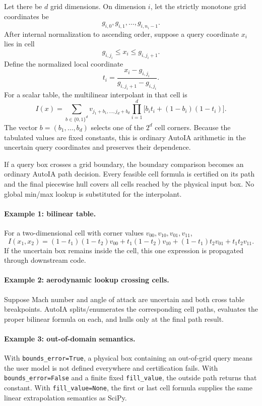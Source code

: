 \documentclass[11pt]{article}
\begin{document}
Let there be \(d\) grid dimensions.  On dimension \(i\), let the strictly
monotone grid coordinates be
\[
  g_{i,0},g_{i,1},\ldots,g_{i,n_i-1}.
\]
After internal normalization to ascending order, suppose a query coordinate
\(x_i\) lies in cell
\[
  g_{i,j_i}\le x_i\le g_{i,j_i+1}.
\]
Define the normalized local coordinate
\[
  t_i=\frac{x_i-g_{i,j_i}}{g_{i,j_i+1}-g_{i,j_i}}.
\]
For a scalar table, the multilinear interpolant in that cell is
\[
  \boxed{
  I(x)=
  \sum_{b\in\{0,1\}^d}
  v_{j_1+b_1,\ldots,j_d+b_d}
  \prod_{i=1}^d
  \bigl[b_i t_i+(1-b_i)(1-t_i)\bigr].
  }
\]
The vector \(b=(b_1,\ldots,b_d)\) selects one of the \(2^d\) cell corners.
Because the tabulated values are fixed constants, this is ordinary AutoIA
arithmetic in the uncertain query coordinates and preserves their dependence.

If a query box crosses a grid boundary, the boundary comparison becomes an
ordinary AutoIA path decision.  Every feasible cell formula is certified on its
path and the final piecewise hull covers all cells reached by the physical input
box.  No global min/max lookup is substituted for the interpolant.

\paragraph{Example 1: bilinear table.}
For a two-dimensional cell with corner values \(v_{00},v_{10},v_{01},v_{11}\),
\[
 I(x_1,x_2)=(1-t_1)(1-t_2)v_{00}
 +t_1(1-t_2)v_{10}
 +(1-t_1)t_2v_{01}
 +t_1t_2v_{11}.
\]
If the uncertain box remains inside the cell, this one expression is propagated
through downstream code.

\paragraph{Example 2: aerodynamic lookup crossing cells.}
Suppose Mach number and angle of attack are uncertain and both cross table
breakpoints.  AutoIA splits/enumerates the corresponding cell paths, evaluates
the proper bilinear formula on each, and hulls only at the final path result.

\paragraph{Example 3: out-of-domain semantics.}
With \texttt{bounds\_error=True}, a physical box containing an out-of-grid query
means the user model is not defined everywhere and certification fails.  With
\texttt{bounds\_error=False} and a finite fixed \texttt{fill\_value}, the outside
path returns that constant.  With \texttt{fill\_value=None}, the first or last
cell formula supplies the same linear extrapolation semantics as SciPy.
\end{document}
